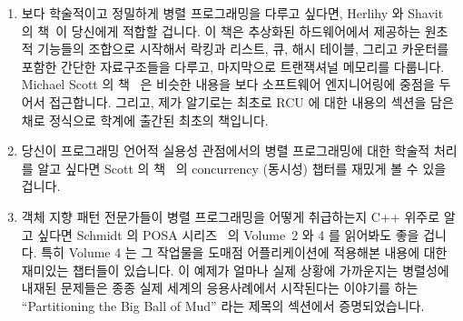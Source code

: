 \begin{enumerate}
\item	보다 학술적이고 정밀하게 병렬 프로그래밍을 다루고 싶다면, Herlihy 와
	Shavit 의 책~\cite{HerlihyShavit2008Textbook}이 당신에게 적합할 겁니다.
	이 책은 추상화된 하드웨어에서 제공하는 원초적 기능들의 조합으로
	시작해서 락킹과 리스트, 큐, 해시 테이블, 그리고 카운터를 포함한 간단한
	자료구조들을 다루고, 마지막으로 트랜잭셔널 메모리를 다룹니다.  Michael
	Scott 의 책~\cite{MichaelScott2013Textbook} 은 비슷한 내용을 보다
	소프트웨어 엔지니어링에 중점을 두어서 접근합니다. 그리고, 제가 알기로는
	최초로 RCU 에 대한 내용의 섹션을 담은 채로 정식으로 학계에 출간된
	최초의 책입니다.

\iffalse
\item	If you prefer a more academic and rigorous treatment of
	parallel programming,
	you might like Herlihy's and Shavit's
	textbook~\cite{HerlihyShavit2008Textbook}.
	This book starts with an interesting combination
	of low-level primitives at high levels of abstraction
	from the hardware, and works its way through locking
	and simple data structures including lists, queues,
	hash tables, and counters, culminating with transactional
	memory.
	Michael Scott's textbook~\cite{MichaelScott2013Textbook}
	approaches similar material with more of a
	software-engineering focus, and, as far as I know, is
	the first formally published academic textbook to include a
	section devoted to RCU.
\fi

\item	당신이 프로그래밍 언어적 실용성 관점에서의 병렬 프로그래밍에 대한
	학술적 처리를 알고 싶다면 Scott 의 책~\cite{MichaelScott2006Textbook}
	의 concurrency (동시성) 챕터를 재밌게 볼 수 있을 겁니다.

\iffalse
\item	If you would like an academic treatment of parallel
	programming from a programming\-/language\-/pragmatics viewpoint,
	you might be interested in the concurrency chapter from Scott's
	textbook~\cite{MichaelScott2006Textbook}
	on programming-language pragmatics.
\fi

\item	객체 지향 패턴 전문가들이 병렬 프로그래밍을 어떻게 취급하는지 C++
	위주로 알고 싶다면 Schmidt 의 POSA
	시리즈~\cite{SchmidtStalRohnertBuschmann2000v2Textbook,
	BuschmannHenneySchmidt2007v4Textbook} 의 Volume~2 와 4 를 읽어봐도 좋을
	겁니다.  특히 Volume 4 는 그 작업물을 도매점 어플리케이션에 적용해본
	내용에 대한 재미있는 챕터들이 있습니다.  이 예제가 얼마나 실제 상황에
	가까운지는 병렬성에 내재된 문제들은 종종 실제 세계의 응용사례에서
	시작된다는 이야기를 하는 ``Partitioning the Big Ball of Mud'' 라는
	제목의 섹션에서 증명되었습니다.


\end{enumerate}
